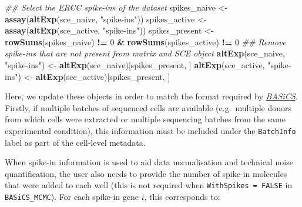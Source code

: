\documentclass[9pt,a4paper,]{extarticle}
\newenvironment{Shaded}{\begin{snugshade}}{\end{snugshade}}
\newcommand{\CommentTok}[1]{\textcolor[rgb]{0.56,0.35,0.01}{\textit{#1}}}
\newcommand{\DecValTok}[1]{\textcolor[rgb]{0.00,0.00,0.81}{#1}}
\newcommand{\KeywordTok}[1]{\textcolor[rgb]{0.13,0.29,0.53}{\textbf{#1}}}
\newcommand{\NormalTok}[1]{#1}
\newcommand{\OperatorTok}[1]{\textcolor[rgb]{0.81,0.36,0.00}{\textbf{#1}}}
\newcommand{\StringTok}[1]{\textcolor[rgb]{0.31,0.60,0.02}{#1}}
\begin{document}
\begin{Shaded}
\begin{Highlighting}[]
\CommentTok{## Select the ERCC spike-ins of the dataset}
\NormalTok{spikes_naive <-}\StringTok{ }\KeywordTok{assay}\NormalTok{(}\KeywordTok{altExp}\NormalTok{(sce_naive, }\StringTok{"spike-ins"}\NormalTok{))}
\NormalTok{spikes_active <-}\StringTok{ }\KeywordTok{assay}\NormalTok{(}\KeywordTok{altExp}\NormalTok{(sce_active, }\StringTok{"spike-ins"}\NormalTok{))}
\NormalTok{spikes_present <-}\StringTok{ }\KeywordTok{rowSums}\NormalTok{(spikes_naive) }\OperatorTok{!=}\StringTok{ }\DecValTok{0} \OperatorTok{&}\StringTok{ }\KeywordTok{rowSums}\NormalTok{(spikes_active) }\OperatorTok{!=}\StringTok{ }\DecValTok{0}
\CommentTok{## Remove spike-ins that are not present from matrix and SCE object}
\KeywordTok{altExp}\NormalTok{(sce_naive, }\StringTok{"spike-ins"}\NormalTok{) <-}\StringTok{ }\KeywordTok{altExp}\NormalTok{(sce_naive)[spikes_present, ]}
\KeywordTok{altExp}\NormalTok{(sce_active, }\StringTok{"spike-ins"}\NormalTok{) <-}\StringTok{ }\KeywordTok{altExp}\NormalTok{(sce_active)[spikes_present, ]}
\end{Highlighting}
\end{Shaded}

Here, we update these objects in order to match the format required by
\emph{\href{https://bioconductor.org/packages/3.11/BASiCS}{BASiCS}}. Firstly, if multiple batches of sequenced cells are
available (e.g.~multiple donors from which cells were extracted or multiple
sequencing batches from the same experimental condition), this information
must be included under the \texttt{BatchInfo} label as part of the cell-level metadata.

\begin{Shaded}
\end{Shaded}

When spike-in information is used to aid data normalisation and technical noise
quantification, the user also needs to provide the number of spike-in molecules
that were added to each well (this is not required when \texttt{WithSpikes\ =\ FALSE} in
\texttt{BASiCS\_MCMC}).
For each spike-in gene \(i\), this corresponds to:
\end{document}

